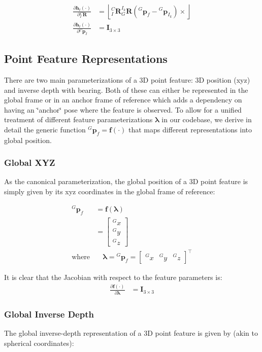 \begin{align*} \frac{\partial \mathbf h_t (\cdot)}{\partial {}^{C}_{I}\mathbf{R}} &= \left\lfloor {}^{C}_{I}\mathbf{R}{}^{I_k}_{G}\mathbf{R}({}^{G}\mathbf{p}_f-{}^{G}\mathbf{p}_{I_k}) \times\right\rfloor \\ \frac{\partial \mathbf h_t (\cdot)}{\partial {}^{C}\mathbf{p}_I} &= \mathbf{I}_{3\times 3} \end{align*}\hypertarget{update-feat_feat-rep}{}\subsection{Point Feature Representations}\label{update-feat_feat-rep}
There are two main parameterizations of a 3D point feature\+: 3D position (xyz) and inverse depth with bearing. Both of these can either be represented in the global frame or in an anchor frame of reference which adds a dependency on having an \char`\"{}anchor\char`\"{} pose where the feature is observed. To allow for a unified treatment of different feature parameterizations $\boldsymbol \lambda$ in our codebase, we derive in detail the generic function ${}^{G}\mathbf{p}_f=\mathbf f (\cdot)$ that maps different representations into global position.\hypertarget{update-feat_feat-rep-global-xyz}{}\subsubsection{Global X\+YZ}\label{update-feat_feat-rep-global-xyz}
As the canonical parameterization, the global position of a 3D point feature is simply given by its xyz coordinates in the global frame of reference\+:

\begin{align*} {}^{G}\mathbf{p}_f &= \mathbf f(\boldsymbol\lambda) \\ &= \begin{bmatrix} {}^Gx \\ {}^Gy \\ {}^Gz \end{bmatrix} \\ \text{where} &\quad \boldsymbol\lambda = {}^{G}\mathbf{p}_f = \begin{bmatrix} {}^Gx & {}^Gy & {}^Gz \end{bmatrix}^\top \end{align*}

It is clear that the Jacobian with respect to the feature parameters is\+: \begin{align*} \frac{\partial \mathbf f(\cdot)}{\partial \boldsymbol\lambda} &= \mathbf{I}_{3\times 3} \end{align*}\hypertarget{update-feat_feat-rep-global-inv}{}\subsubsection{Global Inverse Depth}\label{update-feat_feat-rep-global-inv}
The global inverse-\/depth representation of a 3D point feature is given by (akin to spherical coordinates)\+:

